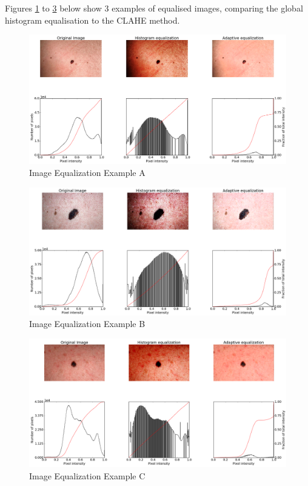 Figures \ref{fig:eq_A} to \ref{fig:eq_C} below show 3 examples of equalised images, comparing the global histogram  equalisation to the CLAHE method.

\begin{figure}[H]
    \includegraphics[width=\textwidth,keepaspectratio]{assets/image_processing/equalization/figure_01.png}
    \caption{Image Equalization Example A}
    \label{fig:eq_A}
\end{figure}
\begin{figure}[H]
    \includegraphics[width=\textwidth,keepaspectratio]{assets/image_processing/equalization/figure_02.png}
    \caption{Image Equalization Example B}
    \label{fig:eq_B}
\end{figure}
\begin{figure}[H]
    \includegraphics[width=\textwidth,keepaspectratio]{assets/image_processing/equalization/figure_03.png}
    \caption{Image Equalization Example C}
    \label{fig:eq_C}
\end{figure}

